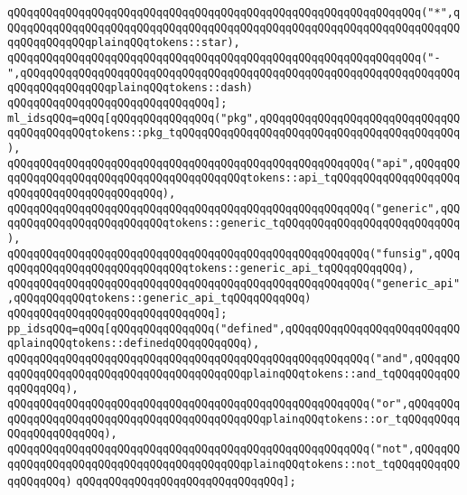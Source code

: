 \verb|qQQqqQQqqQQqqQQqqQQqqQQqqQQqqQQqqQQqqQQqqQQqqQQqqQQqqQQqqQQqqQQq("*",qQQqqQQqqQQqqQQqqQQqqQQqqQQqqQQqqQQqqQQqqQQqqQQqqQQqqQQqqQQqqQQqqQQqqQQqqQQqqQQqqQQqplainqQQqtokens::star),|\newline
\verb|qQQqqQQqqQQqqQQqqQQqqQQqqQQqqQQqqQQqqQQqqQQqqQQqqQQqqQQqqQQqqQQq("-",qQQqqQQqqQQqqQQqqQQqqQQqqQQqqQQqqQQqqQQqqQQqqQQqqQQqqQQqqQQqqQQqqQQqqQQqqQQqqQQqqQQqplainqQQqtokens::dash)|\newline
\verb|qQQqqQQqqQQqqQQqqQQqqQQqqQQqqQQq];|\newline
\newline
\verb|ml_idsqQQq=qQQq[qQQqqQQqqQQqqQQq("pkg",qQQqqQQqqQQqqQQqqQQqqQQqqQQqqQQqqQQqqQQqqQQqtokens::pkg_tqQQqqQQqqQQqqQQqqQQqqQQqqQQqqQQqqQQqqQQqqQQq),|\newline
\verb|qQQqqQQqqQQqqQQqqQQqqQQqqQQqqQQqqQQqqQQqqQQqqQQqqQQqqQQq("api",qQQqqQQqqQQqqQQqqQQqqQQqqQQqqQQqqQQqqQQqqQQqtokens::api_tqQQqqQQqqQQqqQQqqQQqqQQqqQQqqQQqqQQqqQQqqQQq),|\newline
\verb|qQQqqQQqqQQqqQQqqQQqqQQqqQQqqQQqqQQqqQQqqQQqqQQqqQQqqQQq("generic",qQQqqQQqqQQqqQQqqQQqqQQqqQQqtokens::generic_tqQQqqQQqqQQqqQQqqQQqqQQqqQQq),|\newline
\verb|qQQqqQQqqQQqqQQqqQQqqQQqqQQqqQQqqQQqqQQqqQQqqQQqqQQqqQQq("funsig",qQQqqQQqqQQqqQQqqQQqqQQqqQQqqQQqtokens::generic_api_tqQQqqQQqqQQq),|\newline
\verb|qQQqqQQqqQQqqQQqqQQqqQQqqQQqqQQqqQQqqQQqqQQqqQQqqQQqqQQq("generic_api",qQQqqQQqqQQqtokens::generic_api_tqQQqqQQqqQQq)|\newline
\verb|qQQqqQQqqQQqqQQqqQQqqQQqqQQqqQQq];|\newline
\newline
\verb|pp_idsqQQq=qQQq[qQQqqQQqqQQqqQQq("defined",qQQqqQQqqQQqqQQqqQQqqQQqqQQqplainqQQqtokens::definedqQQqqQQqqQQq),|\newline
\verb|qQQqqQQqqQQqqQQqqQQqqQQqqQQqqQQqqQQqqQQqqQQqqQQqqQQqqQQq("and",qQQqqQQqqQQqqQQqqQQqqQQqqQQqqQQqqQQqqQQqqQQqplainqQQqtokens::and_tqQQqqQQqqQQqqQQqqQQq),|\newline
\verb|qQQqqQQqqQQqqQQqqQQqqQQqqQQqqQQqqQQqqQQqqQQqqQQqqQQqqQQq("or",qQQqqQQqqQQqqQQqqQQqqQQqqQQqqQQqqQQqqQQqqQQqqQQqplainqQQqtokens::or_tqQQqqQQqqQQqqQQqqQQqqQQq),|\newline
\verb|qQQqqQQqqQQqqQQqqQQqqQQqqQQqqQQqqQQqqQQqqQQqqQQqqQQqqQQq("not",qQQqqQQqqQQqqQQqqQQqqQQqqQQqqQQqqQQqqQQqqQQqplainqQQqtokens::not_tqQQqqQQqqQQqqQQqqQQq)|\newline
\verb|qQQqqQQqqQQqqQQqqQQqqQQqqQQqqQQq];|\newline
